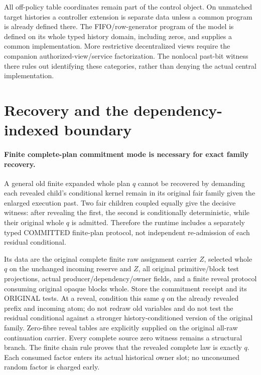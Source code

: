 \documentclass[11pt]{article}\usepackage{amsmath,amssymb,amsthm}
\begin{document}
All off-policy table coordinates remain part of the control object. On unmatched target histories a controller extension is separate data unless a common program is already defined there. The FIFO/row-generator program of the model is defined on its whole typed history domain, including zeros, and supplies a common implementation. More restrictive decentralized views require the companion authorized-view/service factorization. The nonlocal past-bit witness there rules out identifying these categories, rather than denying the actual central implementation.

\section{Recovery and the dependency-indexed boundary}
\paragraph{Finite complete-plan commitment mode is necessary for exact family recovery.}
A general old finite expanded whole plan $q$ cannot be recovered by demanding each revealed child's conditional kernel remain in its original fair family given the enlarged execution past. Two fair children coupled equally give the decisive witness: after revealing the first, the second is conditionally deterministic, while their original whole $q$ is admitted. Therefore the runtime includes a separately typed COMMITTED finite-plan protocol, not independent re-admission of each residual conditional.

Its data are the original complete finite raw assignment carrier $Z$, selected whole $q$ on the unchanged incoming reserve and $Z$, all original primitive/block test projections, actual producer/dependency/owner fields, and a finite reveal protocol consuming original opaque blocks whole. Store the commitment receipt and its ORIGINAL tests. At a reveal, condition this same $q$ on the already revealed prefix and incoming atom; do not redraw old variables and do not test the residual conditional against a stronger history-conditioned version of the original family. Zero-fibre reveal tables are explicitly supplied on the original all-raw continuation carrier. Every complete source zero witness remains a structural branch. The finite chain rule proves that the revealed complete law is exactly $q$. Each consumed factor enters its actual historical owner slot; no unconsumed random factor is charged early.
\end{document}
